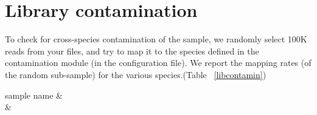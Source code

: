 \part{Library contamination}
To check for cross-species contamination of the sample, we randomly select 100K reads from your files, and try to map it to the species defined in the contamination module (in the configuration file).  We report the mapping rates (of the random sub-sample) for the various species.(Table ~\ref{libcontamin})
\begin{table}[H]
\centering
\caption{Library contamination}\label{libcontamin}
\begin{tabular}{}
\hline
sample name &  \\
\hline
{}
 &  \\
\hline
\end{tabular}
\end{table}
